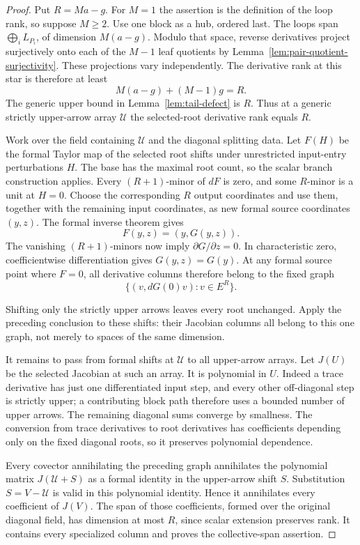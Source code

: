 \documentclass[11pt]{article}
\theoremstyle{definition}
\theoremstyle{remark}
\numberwithin{equation}{section}
\begin{document}
\begin{proof}
Put \(R=Ma-g\). For \(M=1\) the assertion is the definition of
the loop rank, so suppose \(M\geq2\). Use one block as a hub,
ordered last. The loops span \(\bigoplus_i L_{P_i}\), of dimension
\(M(a-g)\). Modulo that space, reverse derivatives project
surjectively onto each of the \(M-1\) leaf quotients by
Lemma~\ref{lem:pair-quotient-surjectivity}. These projections vary
independently. The derivative rank at this star is therefore at
least
\[
 M(a-g)+(M-1)g=R.
\]
The generic upper bound in Lemma~\ref{lem:tail-defect} is \(R\).
Thus at a generic strictly upper-arrow array \(\mathcal U\) the
selected-root derivative rank equals \(R\).

Work over the field containing \(\mathcal U\) and the diagonal
splitting data. Let \(F(H)\) be the formal Taylor map of the
selected root shifts under unrestricted input-entry perturbations
\(H\). The base has the maximal root count, so the scalar branch
construction applies. Every \((R+1)\)-minor of \(dF\) is zero,
and some \(R\)-minor is a unit at \(H=0\). Choose the corresponding
\(R\) output coordinates and use them, together with the remaining
input coordinates, as new formal source coordinates \((y,z)\).
The formal inverse theorem gives
\[
 F(y,z)=(y,G(y,z)).
\]
The vanishing \((R+1)\)-minors now imply
\(\partial G/\partial z=0\). In characteristic zero, coefficientwise
differentiation gives \(G(y,z)=G(y)\). At any formal source point
where \(F=0\), all derivative columns therefore belong to the fixed
graph
\[
 \{(v,dG(0)v):v\in E^R\}.
\]

Shifting only the strictly upper arrows leaves every root unchanged.
Apply the preceding conclusion to these shifts: their Jacobian
columns all belong to this one graph, not merely to spaces of the
same dimension.

It remains to pass from formal shifts at \(\mathcal U\) to all
upper-arrow arrays. Let \(J(U)\) be the selected Jacobian at such
an array. It is polynomial in \(U\). Indeed a trace derivative
has just one differentiated input step, and every other
off-diagonal step is strictly upper; a contributing block path
therefore uses a bounded number of upper arrows. The remaining
diagonal sums converge by smallness. The conversion from trace
derivatives to root derivatives has coefficients depending only
on the fixed diagonal roots, so it preserves polynomial dependence.

Every covector annihilating the preceding graph annihilates the
polynomial matrix \(J(\mathcal U+S)\) as a formal identity in
the upper-arrow shift \(S\). Substitution \(S=V-\mathcal U\)
is valid in this polynomial identity. Hence it annihilates every
coefficient of \(J(V)\). The span of those coefficients, formed
over the original diagonal field, has dimension at most \(R\),
since scalar extension preserves rank. It contains every specialized
column and proves the collective-span assertion.


\end{proof}
\end{document}
